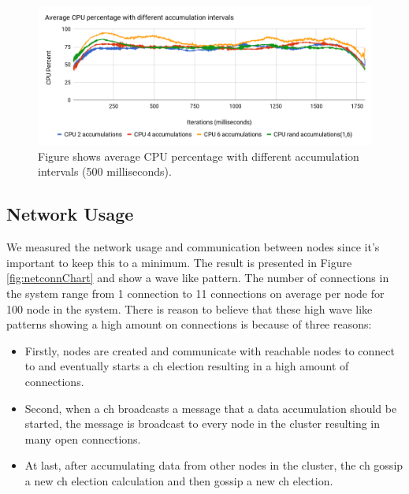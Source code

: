 \documentclass[USenglish]{uit-thesis}
\begin{document}
\begin{figure} [!b]
\centering
\includegraphics[width=\textwidth]{cpuChart.png}
\caption{Figure shows average CPU percentage with different accumulation intervals (500 milliseconds).}
\label{fig:cpuChart}
\end{figure}



\newpage

\subsection{Network Usage}
We measured the network usage and communication between nodes since it's important to keep this to a minimum. The result is presented in Figure \ref{fig:netconnChart} and show a wave like pattern. The number of connections in the system range from 1 connection to 11 connections on average per node for 100 node in the system.
There is reason to believe that these high wave like patterns showing a high amount on connections is because of three reasons:

\begin{itemize}
\item Firstly, nodes are created and communicate with reachable nodes to connect to and eventually starts a \gls{ch} election resulting in a high amount of connections.
\item Second, when a \gls{ch} broadcasts a message that a data accumulation should be started, the message is broadcast to every node in the cluster resulting in many open connections.
\item At last, after accumulating data from other nodes in the cluster, the \gls{ch} gossip a new \gls{ch} election calculation and then gossip a new \gls{ch} election.
\end{itemize}
\end{document}
